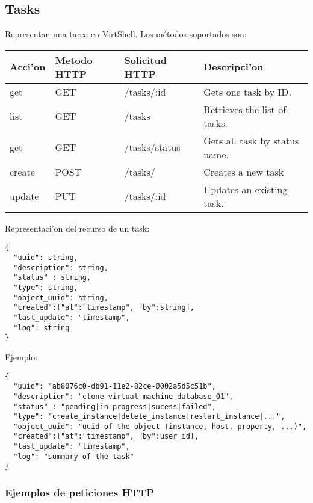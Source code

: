 \subsection{Tasks}
Representan una tarea en VirtShell. Los métodos soportados son:

\begin{center}
 \begin{tabular}{| l | l | l | l |}
 \hline
  \rowcolor{blueapi}
  \textbf{Acci'on} & \textbf{Metodo HTTP} & \textbf{Solicitud HTTP} & \textbf{Descripci'on} \\ [0.5ex] 
  \hline\hline
  get & GET & /tasks/:id & Gets one task by ID. \\
  \hline
  list & GET & /tasks & Retrieves the list of tasks. \\
  \hline
  get & GET & /tasks/status & Gets all task by status name. \\
  \hline 
  create & POST & /tasks/ & Creates a new task \\
  \hline  
  update & PUT & /tasks/:id & Updates an existing task. \\ [1ex] 
  \hline
\end{tabular}
\end{center}

Representaci'on del recurso de un task:

\medskip
\begin{lstlisting}[style=json]
{
  "uuid": string,
  "description": string,
  "status" : string,
  "type": string,
  "object_uuid": string,
  "created":["at":"timestamp", "by":string],
  "last_update": "timestamp",
  "log": string
}
\end{lstlisting}

Ejemplo:

\medskip
\begin{lstlisting}[style=json]
{
  "uuid": "ab8076c0-db91-11e2-82ce-0002a5d5c51b",
  "description": "clone virtual machine database_01",
  "status" : "pending|in progress|sucess|failed",
  "type": "create_instance|delete_instance|restart_instance|...",
  "object_uuid": "uuid of the object (instance, host, property, ...)",
  "created":["at":"timestamp", "by":user_id],
  "last_update": "timestamp",
  "log": "summary of the task"
}
\end{lstlisting}

\subsubsection{Ejemplos de peticiones HTTP}

